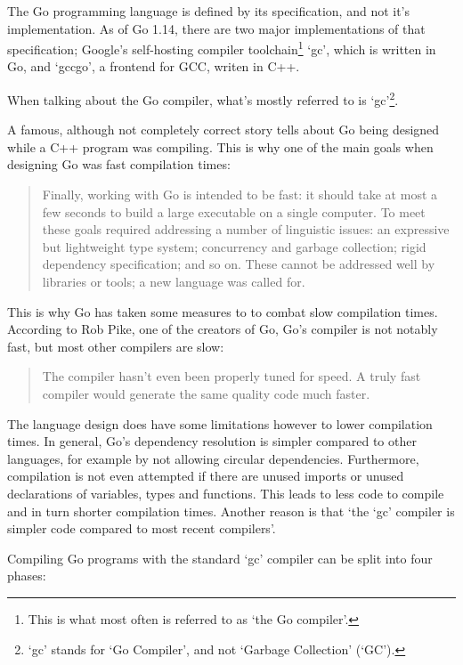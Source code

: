 The Go programming language is defined by its specification\autocite{go-spec}, and not
it's implementation. As of Go 1.14, there are two major implementations of that
specification; Google's self-hosting compiler toolchain\footnote{This is what most
    often is referred to as `the Go compiler'.}
`gc', which is written in Go, and `gccgo', a frontend for GCC, writen in C++.

When talking about the Go compiler, what's mostly referred to is `gc'\footnote{`gc' stands
for `Go Compiler', and not `Garbage Collection' (`GC').}.

A famous, although not completely correct story tells about Go being designed
while a C++ program was compiling\autocite{less-is-more}.
This is why one of the main goals when designing Go was fast compilation times:
\begin{quote}
    Finally, working with Go is intended to be fast: it should take at most a few
    seconds to build a large executable on a single computer. To meet these goals
    required addressing a number of linguistic issues: an expressive but lightweight
    type system; concurrency and garbage collection; rigid dependency specification;
    and so on. These cannot be addressed well by libraries or tools; a new language
    was called for.\autocite{go-faq}
\end{quote}

This is why Go has taken some measures to to combat slow compilation times. According
to Rob Pike, one of the creators of Go, Go's compiler is not notably fast, but
most other compilers are slow:

\begin{quote}
    The compiler hasn't even been properly tuned for speed. A truly fast compiler
    would generate the same quality code much faster.\autocite{nuts-compiler}
\end{quote}

The language design does have some limitations
however to lower compilation times. In general, Go's dependency resolution is simpler
compared to other languages, for example by not allowing circular dependencies.
Furthermore, compilation is not even attempted if there are unused
imports or unused declarations of variables, types and functions.
This leads to less code to compile and in turn shorter compilation times.
Another reason is that `the `gc' compiler is simpler code compared to most
recent compilers'\autocite{nuts-compiler}.

Compiling Go programs with the standard `gc' compiler can be split into four
phases:


